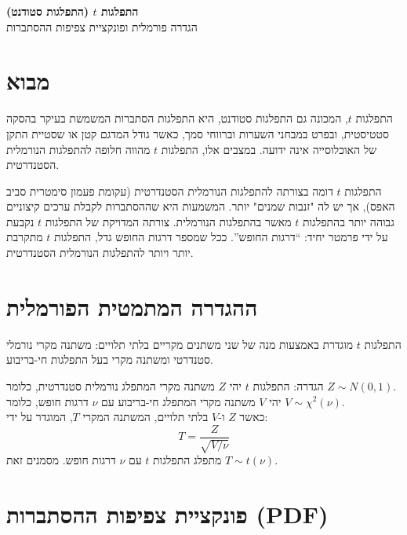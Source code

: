 \documentclass[12pt]{article}
\newcommand{\enquote}[1]{\textquotedblleft #1\textquotedblright}
\begin{document}
\begin{center}
    \fontsize{24pt}{28pt}\selectfont
    \textbf{התפלגות \(t\) (התפלגות סטודנט)} \\
    \vspace{12pt}
    \fontsize{16pt}{18pt}\selectfont
    הגדרה פורמלית ופונקציית צפיפות ההסתברות \\
\end{center}

\vspace{24pt} %

\section*{מבוא}
התפלגות \(t\), המכונה גם התפלגות סטודנט, היא התפלגות הסתברות המשמשת בעיקר בהסקה סטטיסטית, ובפרט במבחני השערות וברווחי סמך, כאשר גודל המדגם קטן או שסטיית התקן של האוכלוסייה אינה ידועה. במצבים אלו, התפלגות \(t\) מהווה חלופה להתפלגות הנורמלית הסטנדרטית.

\vspace{12pt}

התפלגות \(t\) דומה בצורתה להתפלגות הנורמלית הסטנדרטית (עקומת פעמון סימטרית סביב האפס), אך יש לה "זנבות שמנים" יותר. המשמעות היא שההסתברות לקבלת ערכים קיצוניים גבוהה יותר בהתפלגות \(t\) מאשר בהתפלגות הנורמלית. צורתה המדויקת של התפלגות \(t\) נקבעת על ידי פרמטר יחיד: \enquote{דרגות החופש}. ככל שמספר דרגות החופש גדל, התפלגות \(t\) מתקרבת יותר ויותר להתפלגות הנורמלית הסטנדרטית.

\section*{ההגדרה המתמטית הפורמלית}

התפלגות \(t\) מוגדרת באמצעות מנה של שני משתנים מקריים בלתי תלויים: משתנה מקרי נורמלי סטנדרטי ומשתנה מקרי בעל התפלגות חי-בריבוע.

\begin{definitionBox}{הגדרה: התפלגות \(t\)}
יהי \(Z\) משתנה מקרי המתפלג נורמלית סטנדרטית, כלומר \(Z \sim N(0, 1)\). \\
יהי \(V\) משתנה מקרי המתפלג חי-בריבוע עם \(\nu\) דרגות חופש, כלומר \(V \sim \chi^2(\nu)\). \\
כאשר \(Z\) ו-\(V\) בלתי תלויים, המשתנה המקרי \(T\), המוגדר על ידי:
\[ T = \frac{Z}{\sqrt{V/\nu}} \]
מתפלג התפלגות \(t\) עם \(\nu\) דרגות חופש. מסמנים זאת \(T \sim t(\nu)\).
\end{definitionBox}

\section*{פונקציית צפיפות ההסתברות (PDF)}
\end{document}
